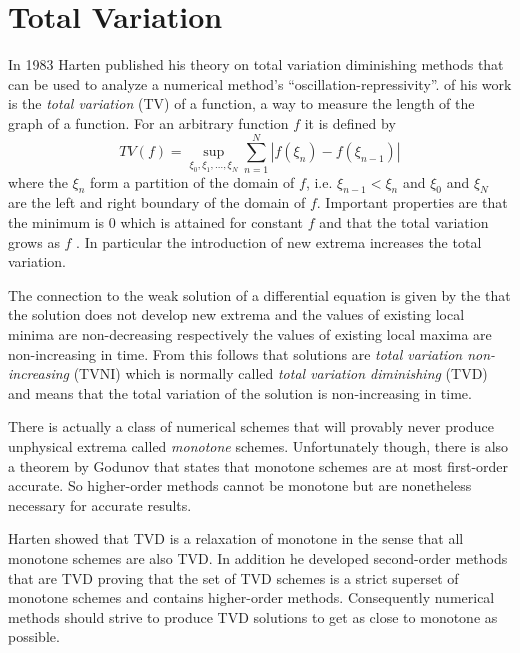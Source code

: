 \section{Total Variation}
\label{sec:total-variation}

In 1983 Harten published his theory on total variation diminishing methods \cite{Harten1983} that can be used to analyze a numerical method's ``oscillation-repressivity''.
 of his work is the \emph{total variation} (TV) of a function, a way to measure the length of the graph of a function.
For an arbitrary function $f$ it is defined\cite[Sec. 6.7]{LeVequeFVMforHP} by
\begin{equation*}
  TV(f) = \sup_{\xi_{0}, \xi_{1}, \dots, \xi_{N}} \sum_{n = 1}^{N} |f(\xi_{n}) - f(\xi_{n - 1})|
\end{equation*}
where the $\xi_{n}$ form a partition of the domain of $f$, i.e. $\xi_{n - 1} < \xi_{n}$ and $\xi_{0}$ and $\xi_{N}$ are the left and right boundary of the domain of $f$.
Important properties are that the minimum is $0$ which is attained for constant $f$ and that the total variation grows as $f$ .
In particular the introduction of new extrema increases the total variation.

The connection to the weak solution of a differential equation is given by the  that the solution does not develop new extrema and the values of existing local minima are non-decreasing respectively the values of existing local maxima are non-increasing in time.
From this  follows that  solutions are \emph{total variation non-increasing} (TVNI) which is normally called \emph{total variation diminishing} (TVD) and means that the total variation of the solution is non-increasing in time.

There is actually a class of numerical schemes that will provably never produce unphysical extrema called \emph{monotone} schemes.
Unfortunately though, there is also a theorem by Godunov\cite{Godunov1959} that states that monotone schemes are at most first-order accurate.
So higher-order methods cannot be monotone but are nonetheless necessary for accurate results.

Harten showed that TVD is a relaxation of monotone in the sense that all monotone schemes are also TVD.
In addition he developed second-order methods that are TVD proving that the set of TVD schemes is a strict superset of monotone schemes and contains higher-order methods.
Consequently numerical methods should strive to produce TVD solutions to get as close to monotone as possible.

